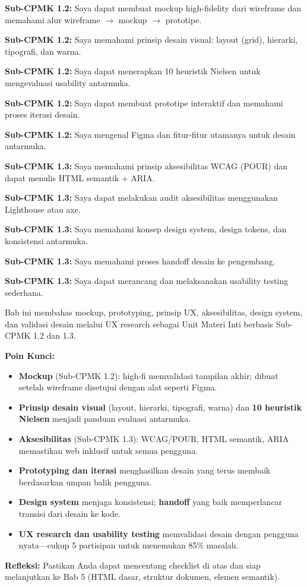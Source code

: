 \documentclass[../main.tex]{subfiles}
\begin{document}
\begin{checklist}
  \item \textbf{Sub-CPMK 1.2:} Saya dapat membuat mockup high-fidelity dari wireframe dan memahami alur wireframe $\to$ mockup $\to$ prototipe.
  \item \textbf{Sub-CPMK 1.2:} Saya memahami prinsip desain visual: layout (grid), hierarki, tipografi, dan warna.
  \item \textbf{Sub-CPMK 1.2:} Saya dapat menerapkan 10 heuristik Nielsen untuk mengevaluasi usability antarmuka.
  \item \textbf{Sub-CPMK 1.2:} Saya dapat membuat prototipe interaktif dan memahami proses iterasi desain.
  \item \textbf{Sub-CPMK 1.2:} Saya mengenal Figma dan fitur-fitur utamanya untuk desain antarmuka.
  \item \textbf{Sub-CPMK 1.3:} Saya memahami prinsip aksesibilitas WCAG (POUR) dan dapat menulis HTML semantik + ARIA.
  \item \textbf{Sub-CPMK 1.3:} Saya dapat melakukan audit aksesibilitas menggunakan Lighthouse atau axe.
  \item \textbf{Sub-CPMK 1.3:} Saya memahami konsep design system, design tokens, dan konsistensi antarmuka.
  \item \textbf{Sub-CPMK 1.3:} Saya memahami proses handoff desain ke pengembang.
  \item \textbf{Sub-CPMK 1.3:} Saya dapat merancang dan melaksanakan usability testing sederhana.
\end{checklist}

\begin{rangkuman}
Bab ini membahas mockup, prototyping, prinsip UX, aksesibilitas, design system, dan validasi desain melalui UX research sebagai Unit Materi Inti berbasis Sub-CPMK 1.2 dan 1.3.

\textbf{Poin Kunci:}
\begin{itemize}
  \item \textbf{Mockup} (Sub-CPMK 1.2): high-fi memvalidasi tampilan akhir; dibuat setelah wireframe disetujui dengan alat seperti Figma.
  \item \textbf{Prinsip desain visual} (layout, hierarki, tipografi, warna) dan \textbf{10 heuristik Nielsen} menjadi panduan evaluasi antarmuka.
  \item \textbf{Aksesibilitas} (Sub-CPMK 1.3): WCAG/POUR, HTML semantik, ARIA memastikan web inklusif untuk semua pengguna.
  \item \textbf{Prototyping dan iterasi} menghasilkan desain yang terus membaik berdasarkan umpan balik pengguna.
  \item \textbf{Design system} menjaga konsistensi; \textbf{handoff} yang baik memperlancar transisi dari desain ke kode.
  \item \textbf{UX research dan usability testing} memvalidasi desain dengan pengguna nyata---cukup 5 partisipan untuk menemukan 85\% masalah.
\end{itemize}

\textbf{Refleksi:} Pastikan Anda dapat mencentang checklist di atas dan siap melanjutkan ke Bab 5 (HTML dasar, struktur dokumen, elemen semantik).
\end{rangkuman}

\ifSubfilesClassLoaded{
  \renewcommand{\bibname}{Daftar Pustaka}
  
  
}{}
\end{document}
